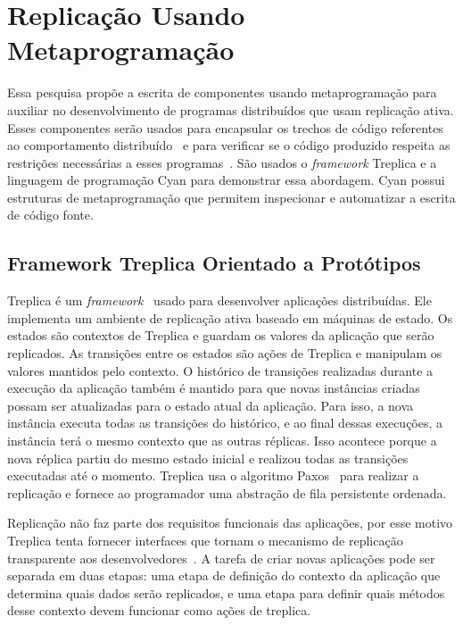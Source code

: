 \chapter{Replicação Usando Metaprogramação}
\label{cap:pesquisa}

Essa pesquisa propõe a escrita de componentes usando metaprogramação para auxiliar no desenvolvimento de programas distribuídos que usam replicação ativa. Esses componentes serão usados para encapsular os trechos de código referentes ao comportamento distribuído~\cite{tourwe2003identifying} e para verificar se o código produzido respeita as restrições necessárias a esses programas~\cite{filman2002source}. São usados o \emph{framework} Treplica e a linguagem de programação Cyan para demonstrar essa abordagem. Cyan possui estruturas de metaprogramação que permitem inspecionar e automatizar a escrita de código fonte.

\section{Framework Treplica Orientado a Protótipos}
\label{sec:treplicaframe}

Treplica é um \emph{framework}~\cite{vieira2010implementation} usado para desenvolver aplicações distribuídas. Ele implementa um ambiente de replicação ativa baseado em máquinas de estado. Os estados são contextos de Treplica e guardam os valores da aplicação que serão replicados. As transições entre os estados são ações de Treplica e manipulam os valores mantidos pelo contexto. O histórico de transições realizadas durante a execução da aplicação também é mantido para que novas instâncias criadas possam ser atualizadas para o estado atual da aplicação. Para isso, a nova instância executa todas as transições do histórico, e ao final dessas execuções, a instância terá o mesmo contexto que as outras réplicas. Isso acontece porque a nova réplica partiu do mesmo estado inicial e realizou todas as transições executadas até o momento. Treplica usa o algoritmo Paxos~\cite{lamport2006fast} para realizar a replicação e fornece ao programador uma abstração de fila persistente ordenada.

Replicação não faz parte dos requisitos funcionais das aplicações, por esse motivo Treplica tenta fornecer interfaces que tornam o mecanismo de replicação transparente aos desenvolvedores~\cite{vieira2010implementation}. A tarefa de criar novas aplicações pode ser separada em duas etapas: uma etapa de definição do contexto da aplicação que determina quais dados serão replicados, e uma etapa para definir quais métodos desse contexto devem funcionar como ações de treplica. 

